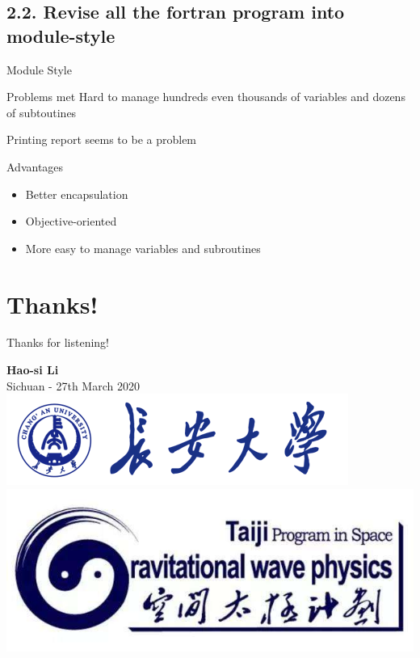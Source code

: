 \documentclass[12pt,english,ignorenonframetext,]{beamer}
\begin{document}
\subsection{\hfill{}2.2. Revise all the fortran program into module-style\hfill{}}
\begin{frame}{Module Style}
	\begin{block}{Problems met}
		Hard to manage hundreds even thousands of variables and dozens of subtoutines
		
		Printing report seems to be a problem
	\end{block}
	\begin{block}{Advantages}
		\begin{itemize}
			\item Better encapsulation
			\item Objective-oriented
			\item More easy to manage variables and subroutines
		\end{itemize}
	\end{block}
\end{frame}

\section{Thanks!}


\begin{frame}
	\centering
	
	\begin{spacing}{2}
	\begin{Huge}
		Thanks for listening!\\
	\end{Huge}
	\end{spacing}
	\begin{spacing}{3}
		
	\end{spacing}
	\textbf{Hao-si Li}\\
	Sichuan - 27th March 2020\\
		
	\includegraphics[height=0.16\textheight]{../common/logo_chd.png}
	\includegraphics[height=0.16\textheight, width=0.6\linewidth]{../common/log_tiji.jpg}
		
\end{frame}
\end{document}
